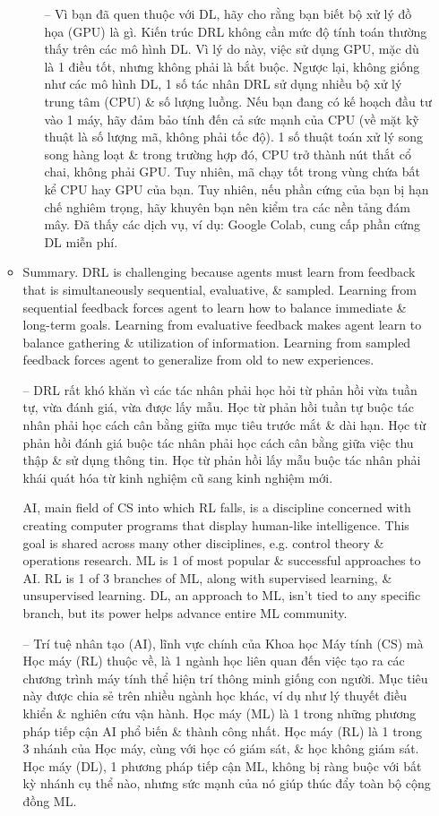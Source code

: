 \documentclass{article}
\begin{document}
\begin{itemize}
\begin{itemize}
\begin{itemize}
            -- Vì bạn đã quen thuộc với DL, hãy cho rằng bạn biết bộ xử lý đồ họa (GPU) là gì. Kiến trúc DRL không cần mức độ tính toán thường thấy trên các mô hình DL. Vì lý do này, việc sử dụng GPU, mặc dù là 1 điều tốt, nhưng không phải là bắt buộc. Ngược lại, không giống như các mô hình DL, 1 số tác nhân DRL sử dụng nhiều bộ xử lý trung tâm (CPU) \& số lượng luồng. Nếu bạn đang có kế hoạch đầu tư vào 1 máy, hãy đảm bảo tính đến cả sức mạnh của CPU (về mặt kỹ thuật là số lượng mã, không phải tốc độ). 1 số thuật toán xử lý song song hàng loạt \& trong trường hợp đó, CPU trở thành nút thắt cổ chai, không phải GPU. Tuy nhiên, mã chạy tốt trong vùng chứa bất kể CPU hay GPU của bạn. Tuy nhiên, nếu phần cứng của bạn bị hạn chế nghiêm trọng, hãy khuyên bạn nên kiểm tra các nền tảng đám mây. Đã thấy các dịch vụ, ví dụ: Google Colab, cung cấp phần cứng DL miễn phí.
        \end{itemize}
        \item {\sf Summary.} DRL is challenging because agents must learn from feedback that is simultaneously sequential, evaluative, \& sampled. Learning from sequential feedback forces agent to learn how to balance immediate \& long-term goals. Learning from evaluative feedback makes agent learn to balance gathering \& utilization of information. Learning from sampled feedback forces agent to generalize from old to new experiences.

        -- DRL rất khó khăn vì các tác nhân phải học hỏi từ phản hồi vừa tuần tự, vừa đánh giá, vừa được lấy mẫu. Học từ phản hồi tuần tự buộc tác nhân phải học cách cân bằng giữa mục tiêu trước mắt \& dài hạn. Học từ phản hồi đánh giá buộc tác nhân phải học cách cân bằng giữa việc thu thập \& sử dụng thông tin. Học từ phản hồi lấy mẫu buộc tác nhân phải khái quát hóa từ kinh nghiệm cũ sang kinh nghiệm mới.

        AI, main field of CS into which RL falls, is a discipline concerned with creating computer programs that display human-like intelligence. This goal is shared across many other disciplines, e.g. control theory \& operations research. ML is 1 of most popular \& successful approaches to AI. RL is 1 of 3 branches of ML, along with supervised learning, \& unsupervised learning. DL, an approach to ML, isn't tied to any specific branch, but its power helps advance entire ML community.

        -- Trí tuệ nhân tạo (AI), lĩnh vực chính của Khoa học Máy tính (CS) mà Học máy (RL) thuộc về, là 1 ngành học liên quan đến việc tạo ra các chương trình máy tính thể hiện trí thông minh giống con người. Mục tiêu này được chia sẻ trên nhiều ngành học khác, ví dụ như lý thuyết điều khiển \& nghiên cứu vận hành. Học máy (ML) là 1 trong những phương pháp tiếp cận AI phổ biến \& thành công nhất. Học máy (RL) là 1 trong 3 nhánh của Học máy, cùng với học có giám sát, \& học không giám sát. Học máy (DL), 1 phương pháp tiếp cận ML, không bị ràng buộc với bất kỳ nhánh cụ thể nào, nhưng sức mạnh của nó giúp thúc đẩy toàn bộ cộng đồng ML.


\end{itemize}
\end{itemize}
\end{document}
